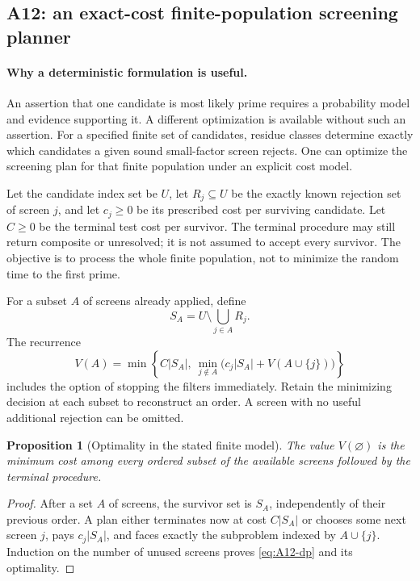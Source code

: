 \documentclass[11pt,a4paper]{article}
\newtheorem{proposition}[theorem]{Proposition}
\theoremstyle{definition}\newtheorem{definition}[theorem]{Definition}
\theoremstyle{remark}\newtheorem{remark}[theorem]{Remark}
\begin{document}
\subsection{A12: an exact-cost finite-population screening planner}
\label{alg:A12}

\paragraph{Why a deterministic formulation is useful.}
An assertion that one candidate is most likely prime requires a probability
model and evidence supporting it. A different optimization is available
without such an assertion. For a specified finite set of candidates,
residue classes determine exactly which candidates a given sound
small-factor screen rejects. One can optimize the screening plan for that
finite population under an explicit cost model.

Let the candidate index set be $U$, let $R_j\subseteq U$ be the exactly known
rejection set of screen $j$, and let $c_j\ge0$ be its prescribed cost per
surviving candidate. Let $C\ge0$ be the terminal test cost per survivor.
The terminal procedure may still return composite or unresolved; it is
not assumed to accept every survivor. The objective is to process the
whole finite population, not to minimize the random time to the first
prime.

For a subset $A$ of screens already applied, define
\[
 S_A=U\setminus\bigcup_{j\in A}R_j.
\]
The recurrence
\begin{equation}\label{eq:A12-dp}
 V(A)=\min\left\{
 C|S_A|,\
 \min_{j\notin A}\bigl(c_j|S_A|+V(A\cup\{j\})\bigr)
 \right\}
\end{equation}
includes the option of stopping the filters immediately. Retain the
minimizing decision at each subset to reconstruct an order. A screen with
no useful additional rejection can be omitted.

\begin{proposition}[Optimality in the stated finite model]\label{prop:A12}
The value $V(\varnothing)$ is the minimum cost among every ordered subset
of the available screens followed by the terminal procedure.
\end{proposition}
\begin{proof}
After a set $A$ of screens, the survivor set is $S_A$, independently of
their previous order. A plan either terminates now at cost $C|S_A|$ or
chooses some next screen $j$, pays $c_j|S_A|$, and faces exactly the
subproblem indexed by $A\cup\{j\}$. Induction on the number of unused
screens proves \eqref{eq:A12-dp} and its optimality.
\end{proof}
\end{document}
